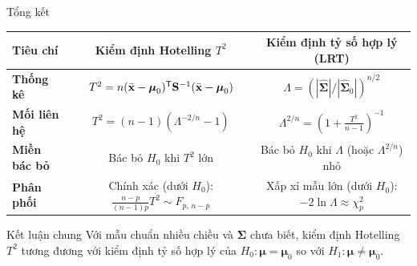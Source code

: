 \begin{frame}[t]{Tổng kết}
  \centering
  \footnotesize
  \renewcommand{\arraystretch}{1.9}
  \begin{tabular}{lcc}
    \toprule
    \textbf{Tiêu chí} & \textbf{Kiểm định Hotelling $T^2$} & \textbf{Kiểm định tỷ số hợp lý (LRT)} \\
    \midrule
    \textbf{Thống kê} & $T^2 = n(\bar{\mathbf{x}} - \boldsymbol{\mu}_0)^{\mathsf T} \mathbf{S}^{-1} (\bar{\mathbf{x}} - \boldsymbol{\mu}_0)$ & $\Lambda = (|\hat{\boldsymbol{\Sigma}}| / |\hat{\boldsymbol{\Sigma}}_0|)^{n/2}$ \\
    \textbf{Mối liên hệ} & $T^2 = (n-1)\left(\Lambda^{-2/n} - 1\right)$ & $\Lambda^{2/n} = \left(1 + \frac{T^2}{n-1}\right)^{-1}$ \\
    \textbf{Miền bác bỏ} & Bác bỏ $H_0$ khi $T^2$ lớn & Bác bỏ $H_0$ khi $\Lambda$ (hoặc $\Lambda^{2/n}$) nhỏ \\
    \textbf{Phân phối} & Chính xác (dưới $H_0$): $\frac{n-p}{(n-1)p} T^2 \sim F_{p,\,n-p}$ & Xấp xỉ mẫu lớn (dưới $H_0$): $-2\ln\Lambda \approx \chi^2_p$ \\
    \bottomrule
  \end{tabular}
  \begin{alertblock}{Kết luận chung}
    Với mẫu chuẩn nhiều chiều và $\boldsymbol\Sigma$ chưa biết, kiểm định Hotelling $T^2$ tương đương với kiểm định tỷ số hợp lý của
    $H_0:\boldsymbol\mu=\boldsymbol\mu_0$ so với
    $H_1:\boldsymbol\mu\neq\boldsymbol\mu_0$.
  \end{alertblock}
\end{frame}
